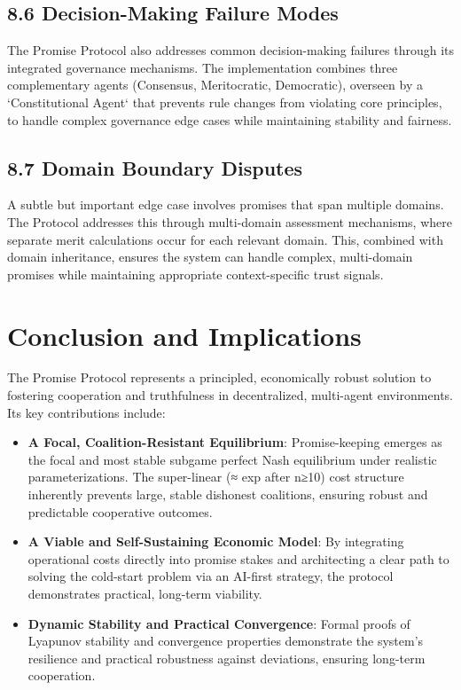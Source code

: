 \documentclass[11pt]{article}
\begin{document}
\subsection{8.6 Decision-Making Failure Modes}
\label{sec:org2e18757}
The Promise Protocol also addresses common decision-making failures through its integrated governance mechanisms. The implementation combines three complementary agents (Consensus, Meritocratic, Democratic), overseen by a `Constitutional Agent` that prevents rule changes from violating core principles, to handle complex governance edge cases while maintaining stability and fairness.
\subsection{8.7 Domain Boundary Disputes}
\label{sec:org10478bb}
A subtle but important edge case involves promises that span multiple domains. The Protocol addresses this through multi-domain assessment mechanisms, where separate merit calculations occur for each relevant domain. This, combined with domain inheritance, ensures the system can handle complex, multi-domain promises while maintaining appropriate context-specific trust signals.
\section{Conclusion and Implications}
\label{sec:org6cc3d14}
The Promise Protocol represents a principled, economically robust solution to fostering cooperation and truthfulness in decentralized, multi-agent environments. Its key contributions include:

\begin{itemize}
\item \textbf{A Focal, Coalition-Resistant Equilibrium}: Promise-keeping emerges as the focal and most stable subgame perfect Nash equilibrium under realistic parameterizations. The super-linear (≈ exp after n≥10) cost structure inherently prevents large, stable dishonest coalitions, ensuring robust and predictable cooperative outcomes.

\item \textbf{A Viable and Self-Sustaining Economic Model}: By integrating operational costs directly into promise stakes and architecting a clear path to solving the cold-start problem via an AI-first strategy, the protocol demonstrates practical, long-term viability.

\item \textbf{Dynamic Stability and Practical Convergence}: Formal proofs of Lyapunov stability and convergence properties demonstrate the system's resilience and practical robustness against deviations, ensuring long-term cooperation.
\end{itemize}
\end{document}
